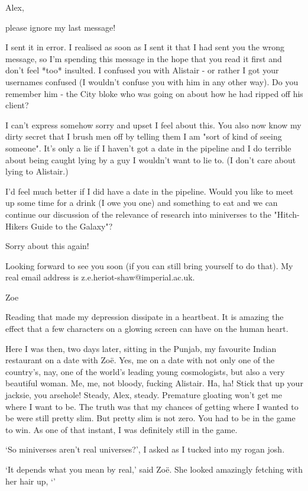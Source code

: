 {\twelvett Alex,

please ignore my last message!

I sent it in error. I realised as soon as I sent it that I had sent
you the wrong message, so I'm spending this message in the hope that
you read it first and don't feel *too* insulted. I confused you with
Alistair - or rather I got your usernames confused (I wouldn't
confuse you with him in any other way). Do you remember him - the
City bloke who was going on about how he had ripped off his client?

I can't express somehow sorry and upset I feel about this. You also
now know my dirty secret that I brush men off by telling them I am
"sort of kind of seeing someone". It's only a lie if I haven't got a
date in the pipeline and I do terrible about being caught lying by a
guy I wouldn't want to lie to. (I don't care about lying to
Alistair.)

I'd feel much better if I did have a date in the pipeline. Would you
like to meet up some time for a drink (I owe you one) and something to eat and we
can continue our discussion of the relevance of research into
miniverses to the "Hitch-Hikers Guide to the Galaxy"?

Sorry about this again!

Looking forward to see you soon (if you can still bring yourself to
do that). My real email address is z.e.heriot-shaw@imperial.ac.uk.

Zoe}

Reading that made my depression dissipate in a heartbeat. It is
amazing the effect that a few characters on a glowing screen can
have on the human heart.

Here I was then, two days later, sitting in the Punjab, my favourite
Indian restaurant on a date with Zo{\"e}. Yes, {\twelveit me\/} on
a date with not only one of the country's, nay, one of the
{\twelveit world's\/} leading young cosmologists, but also a very
beautiful woman. Me, {\twelveit me}, not bloody, fucking Alistair.
Ha, ha! Stick that up your jacksie, you arsehole! Steady, Alex,
steady. Premature gloating won't get me where I want to be. The
truth was that my chances of getting where I wanted to be were still
pretty slim. But pretty slim is not zero. You had to be in the game
to win. As one of that instant, I was definitely still in the game.

`So miniverses aren't real universes?', I asked as I tucked into my
rogan josh.

`It depends what you mean by real,' said Zo{\"e}. She looked
amazingly fetching with her hair up, `'

